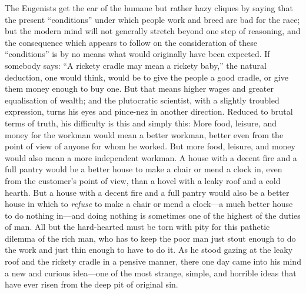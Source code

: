 \documentclass{book}
\begin{document}
The Eugenists get the ear of the humane but rather hazy cliques by saying that the present “conditions” under which people work and breed are bad for the race; but the modern mind will not generally stretch beyond one step of reasoning, and the consequence which appears to follow on the consideration of these “conditions” is by no means what would originally have been expected. If somebody says: “A rickety cradle may mean a rickety baby,” the natural deduction, one would think, would be to give the people a good cradle, or give them money enough to buy one. But that means higher wages and greater equalisation of wealth; and the plutocratic scientist, with a slightly troubled expression, turns his eyes and pince-nez in another direction. Reduced to brutal terms of truth, his difficulty is this and simply this: More food, leisure, and money for the workman would mean a better workman, better even from the point of view of anyone for whom he worked. But more food, leisure, and money would also mean a more independent workman. A house with a decent fire and a full pantry would be a better house to make a chair or mend a clock in, even from the customer’s point of view, than a hovel with a leaky roof and a cold hearth. But a house with a decent fire and a full pantry would also be a better house in which to \emph{refuse} to make a chair or mend a clock—a much better house to do nothing in—and doing nothing is sometimes one of the highest of the duties of man. All but the hard-hearted must be torn with pity for this pathetic dilemma of the rich man, who has to keep the poor man just stout enough to do the work and just thin enough to have to do it. As he stood gazing at the leaky roof and the rickety cradle in a pensive manner, there one day came into his mind a new and curious idea—one of the most strange, simple, and horrible ideas that have ever risen from the deep pit of original sin.
\end{document}
